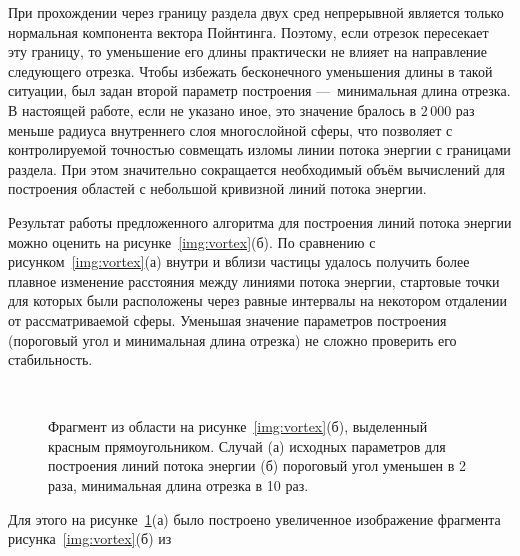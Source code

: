 При прохождении через границу раздела двух сред непрерывной является
только нормальная компонента вектора Пойнтинга. Поэтому, если отрезок
пересекает эту границу, то уменьшение его длины практически не влияет
на направление следующего отрезка. Чтобы избежать бесконечного
уменьшения длины в такой ситуации, был задан второй параметр
построения ---~минимальная длина отрезка.  В настоящей работе, если не
указано иное, это значение бралось в $2\,000$ раз меньше радиуса
внутреннего слоя многослойной сферы, что позволяет с контролируемой
точностью совмещать изломы линии потока энергии с границами
раздела. При этом значительно сокращается необходимый объём вычислений
для построения областей с небольшой кривизной линий потока энергии.

Результат работы предложенного алгоритма для построения линий потока
энергии можно оценить на рисунке~\ref{img:vortex}(б).  По сравнению с
рисунком~\ref{img:vortex}(а) внутри и вблизи частицы удалось получить
более плавное изменение расстояния между линиями потока энергии,
стартовые точки для которых были расположены через равные интервалы на
некотором отдалении от рассматриваемой сферы.  Уменьшая значение параметров
построения (пороговый угол и минимальная длина отрезка) не сложно
проверить его стабильность.
\begin{figure}[t] {\center
  \begin{minipage}[ht]{0.49\linewidth}        
  \end{minipage}
  \begin{minipage}[ht]{0.49\linewidth}
  \end{minipage}
}\\
{\center
  \begin{minipage}[ht]{0.49\linewidth}
  \end{minipage}
  \begin{minipage}[ht]{0.49\linewidth}
  \end{minipage}
}
\caption{Фрагмент из области на рисунке~\ref{img:vortex}(б),
  выделенный красным прямоугольником. Случай (а) исходных параметров
  для построения линий потока энергии (б) пороговый угол уменьшен в 2
  раза, минимальная длина отрезка в 10 раз.\label{img:vortex-crop}}
\end{figure}
Для этого на рисунке~\ref{img:vortex-crop}(а) было построено
увеличенное изображение фрагмента рисунка~\ref{img:vortex}(б) из

